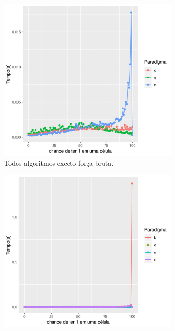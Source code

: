 \documentclass[10.9pt]{article}
\begin{document}
\begin{center}
\begin{figure}
\begin{subfigure}[b]{.3\textwidth}
\centering
\includegraphics[width=1\textwidth]{tempo-rand-a}
\caption{Todos algoritmos exceto força bruta.}\label{fig:tempo-rand-a}
\end{subfigure}
\begin{subfigure}[b]{.3\textwidth}
\centering
\includegraphics[width=1\textwidth]{tempo-rand-b}

\end{subfigure}
\end{figure}
\end{center}
\end{document}
